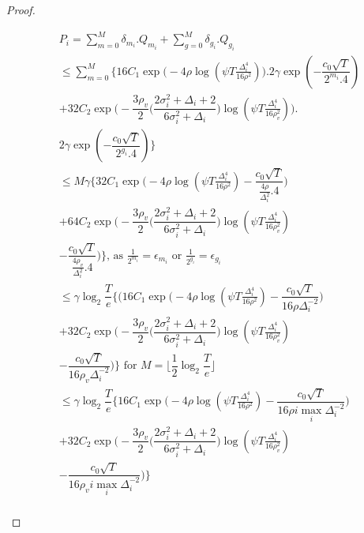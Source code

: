 \begin{proof}
\begin{small}
\begin{align*}
&P_{i} = \sum_{m=0}^{M} \delta_{m_{i}}.Q_{m_{i}} + \sum_{g=0}^{M} \delta_{g_{i}}.Q_{g_{i}}\\
& \leq \sum_{m=0}^{M} \bigg\lbrace 16C_1\exp\bigg(-4\rho\log (\psi T\frac{\Delta_{i}^{4}}{16\rho^{2}})\bigg). 2\gamma \exp(-\dfrac{c_{0}\sqrt{T}}{2^{m_{i}}.4}) \\ &+  32C_2\exp\bigg(- \dfrac{3\rho_v}{2} \bigg(\dfrac{2\sigma_{i}^{2}+\Delta_{i}+2}{6\sigma_{i}^{2}+\Delta_{i}}\bigg) \log(\psi T\frac{\Delta_{i}^{4}}{16\rho_{v}^{2}}) \bigg).\\
& 2\gamma \exp(-\dfrac{c_{0}\sqrt{T}}{2^{g_{i}}.4})\bigg\rbrace\\
& \leq M \gamma \bigg\lbrace 32C_1\exp\bigg(-4\rho\log (\psi T\frac{\Delta_{i}^{4}}{16\rho^{2}})-\dfrac{c_{0}\sqrt{T}}{\frac{4\rho}{\Delta_{i}^{2}}.4}\bigg)\\
& + 64C_2\exp\bigg(- \dfrac{3\rho_v}{2} \bigg(\dfrac{2\sigma_{i}^{2}+\Delta_{i}+2}{6\sigma_{i}^{2}+\Delta_{i}}\bigg)\log(\psi T\frac{\Delta_{i}^{4}}{16\rho_{v}^{2}})\\
& -\dfrac{c_{0}\sqrt{T}}{\frac{4\rho_v}{\Delta_{i}^{2}}.4}  \bigg) \bigg\rbrace
\text{, as $\frac{1}{2^{m_{i}}}=\epsilon_{m_{i}}$ or $\frac{1}{2^{g_{i}}}=\epsilon_{g_{i}}$ }  \\
& \leq \gamma\log_{2}\dfrac{T}{e}\bigg\lbrace \bigg(16C_1\exp\bigg(-4\rho\log (\psi T\frac{\Delta_{i}^{4}}{16\rho^{2}})-\dfrac{c_{0}\sqrt{T}}{16\rho\Delta_{i}^{-2}}\bigg)\\
&+  32C_2\exp\bigg(- \dfrac{3\rho_v}{2} \bigg(\dfrac{2\sigma_{i}^{2}+\Delta_{i}+2}{6\sigma_{i}^{2}+\Delta_{i}}\bigg)\log(\psi T\frac{\Delta_{i}^{4}}{16\rho_{v}^{2}})\\
& -\dfrac{c_{0}\sqrt{T}}{16\rho_v\Delta_{i}^{-2}}  \bigg)\bigg\rbrace 
\text{ for $M=\big \lfloor \dfrac{1}{2}\log_{2} \dfrac{T}{e}\big\rfloor$}\\
& \leq \gamma\log_{2}\dfrac{T}{e}\bigg\lbrace 16C_1\exp\bigg(-4\rho\log (\psi T\frac{\Delta_{i}^{4}}{16\rho^{2}})-\dfrac{c_{0}\sqrt{T}}{16\rho i\max_{i}\Delta_{i}^{-2}}\bigg) \\
& +  32C_2\exp\bigg(- \dfrac{3\rho_v}{2} \bigg(\dfrac{2\sigma_{i}^{2}+\Delta_{i}+2}{6\sigma_{i}^{2}+\Delta_{i}}\bigg)\log(\psi T\frac{\Delta_{i}^{4}}{16\rho_{v}^{2}})\\
& -\dfrac{c_{0}\sqrt{T}}{16\rho_vi\max_{i}\Delta_{i}^{-2}}  \bigg) \bigg\rbrace\\

\end{align*}
\end{small}
\end{proof}
